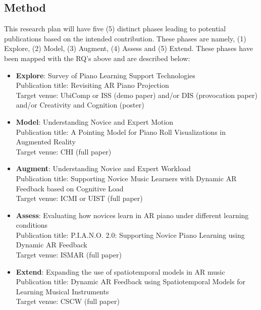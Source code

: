 \documentclass[manuscript,screen]{acmart}
\begin{document}
\subsection{Method}
This research plan will have five (5) distinct phases leading to potential publications based on the intended contribution. These phases are namely, (1) Explore, (2) Model, (3) Augment, (4) Assess and (5) Extend. These phases have been mapped with the RQ's above and are described below: 
\begin{itemize}
    \item \textbf{Explore}: Survey of Piano Learning Support Technologies\\
    Publication title: Revisiting AR Piano Projection\\
    Target venue: UbiComp or ISS (demo paper) and/or DIS (provocation paper) and/or Creativity and Cognition (poster)
    \item \textbf{Model}: Understanding Novice and Expert Motion\\
    Publication title: A Pointing Model for Piano Roll Visualizations in Augmented Reality\\
    Target venue: CHI (full paper)
    \item \textbf{Augment}: Understanding Novice and Expert Workload\\
    Publication title: Supporting Novice Music Learners with Dynamic AR Feedback based on Cognitive Load\\
    Target venue: ICMI or UIST (full paper)
    \item \textbf{Assess}: Evaluating how novices learn in AR piano under different learning conditions\\
    Publication title: P.I.A.N.O. 2.0: Supporting Novice Piano Learning using Dynamic AR Feedback\\
    Target venue: ISMAR (full paper)
    \item \textbf{Extend}: Expanding the use of spatiotemporal models in AR music\\
    Publication title: Dynamic AR Feedback using Spatiotemporal Models for Learning Musical Instruments\\
    Target venue: CSCW (full paper)
\end{itemize}
\end{document}
